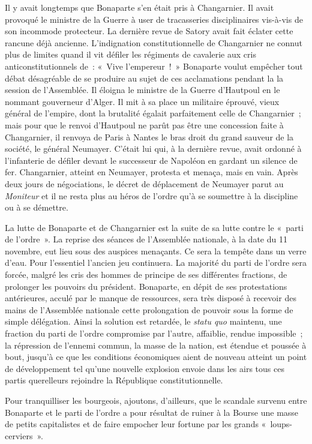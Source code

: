 \documentclass[french,twoside]{book} %
\newcommand\chapterclose{} %
\begin{document}
Il y avait longtemps que Bonaparte s’en était pris à Changarnier. Il avait provoqué le ministre de la Guerre à user de tracasseries disciplinaires vis-à-vis de son incommode protecteur. La dernière revue de Satory avait fait éclater cette rancune déjà ancienne. L’indignation constitutionnelle de Changarnier ne connut plus de limites quand il vit défiler les régiments de cavalerie aux cris anticonstitutionnels de : « Vive l’empereur ! » Bonaparte voulut empêcher tout débat désagréable de se produire au sujet de ces acclamations pendant la la session de l’Assemblée. Il éloigna le ministre de la Guerre d’Hautpoul en le nommant gouverneur d’Alger. Il mit à sa place un militaire éprouvé, vieux général de l’empire, dont la brutalité égalait parfaitement celle de Changarnier ; mais pour que le renvoi d’Hautpoul ne parût pas être une concession faite à Changarnier, il renvoya de Paris à Nantes le bras droit du grand sauveur de la société, le général Neumayer. C’était lui qui, à la dernière revue, avait ordonné à l’infanterie de défiler devant le successeur de Napoléon en gardant un silence de fer. Changarnier, atteint en Neumayer, protesta et menaça, mais en vain. Après deux jours de négociations, le décret de déplacement de Neumayer parut au \emph{Moniteur} et il ne resta plus au héros de l’ordre qu’à se soumettre à la discipline ou à se démettre.\par
La lutte de Bonaparte et de Changarnier est la suite de sa lutte contre le « parti de l’ordre ». La reprise des séances de l’Assemblée nationale, à la date du 11 novembre, eut lieu sous des auspices menaçants. Ce sera la tempête dans un verre d’eau. Pour l’essentiel l’ancien jeu continuera. La majorité du parti de l’ordre sera forcée, malgré les cris des hommes de principe de ses différentes fractions, de prolonger les pouvoirs du président. Bonaparte, en dépit de ses protestations antérieures, acculé par le manque de ressources, sera très disposé à recevoir des mains de l’Assemblée nationale cette prolongation de pouvoir sous la forme de simple délégation. Ainsi la solution est retardée, le \emph{statu quo} maintenu, une fraction du parti de l’ordre compromise par l’autre, affaiblie, rendue impossible ; la répression de l’ennemi commun, la masse de la nation, est étendue et poussée à bout, jusqu’à ce que les conditions économiques aient de nouveau atteint un point de développement tel qu’une nouvelle explosion envoie dans les airs tous ces partis querelleurs rejoindre la République constitutionnelle.\par
Pour tranquilliser les bourgeois, ajoutons, d’ailleurs, que le scandale survenu entre Bonaparte et le parti de l’ordre a pour résultat de ruiner à la Bourse une masse de petits capitalistes et de faire empocher leur fortune par les grands « loups-cerviers ».
\chapterclose
\end{document}
